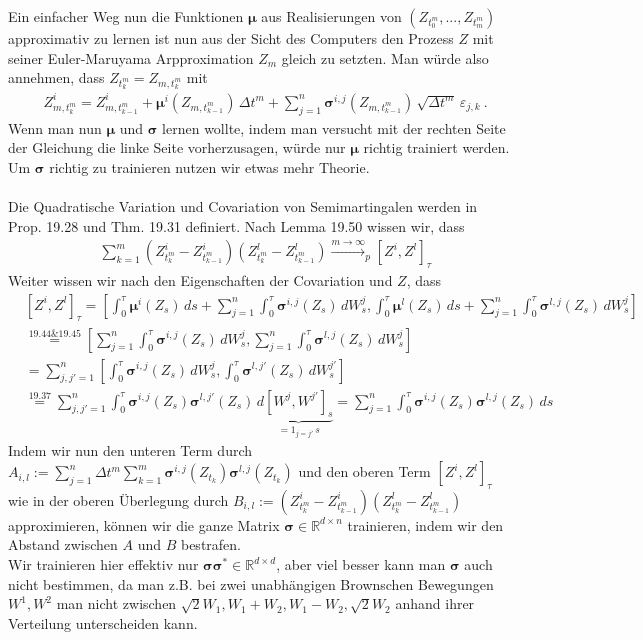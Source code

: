\documentclass[12pt]{article}
\newcommand{\R}{\mathbb{R}}
\newcommand{\bmu}{\bm{\mu}}
\newcommand{\bsig}{\bm{\sigma}}
\begin{document}
	\newpage
	\noindent
	Ein einfacher Weg nun die Funktionen $\bmu$ aus Realisierungen von $(Z_{t^m_0},...,Z_{t^m_m})$ approximativ zu lernen ist nun aus der Sicht des Computers den Prozess $Z$ mit seiner Euler-Maruyama Arpproximation $Z_m$ gleich zu setzten. Man würde also annehmen, dass $Z_{t^m_k} = Z_{m,t^m_k}$ mit
	\begin{align*}
	& Z^i_{m,t^m_k} = Z^i_{m,t^m_{k-1}} + \bmu^i(Z_{m,t^m_{k-1}}) \, \Delta t^m + \sum\limits_{j=1}^n \bsig^{i,j}(Z_{m,t^m_{k-1}}) \, \sqrt{\Delta t^m} \, \varepsilon_{j,k} \ .
	\end{align*}
	Wenn man nun $\bmu$ und $\bsig$ lernen wollte, indem man versucht mit der rechten Seite der Gleichung die linke Seite vorherzusagen, würde nur $\bmu$ richtig trainiert werden. Um $\bsig$ richtig zu trainieren nutzen wir etwas mehr Theorie.\\
	\\
	Die Quadratische Variation und Covariation von Semimartingalen werden in \cite{PfaffiSkript} Prop. 19.28 und Thm. 19.31 definiert. Nach Lemma 19.50 wissen wir, dass
	\begin{align*}
	& \sum\limits_{k=1}^m (Z^i_{t^m_{k}}-Z^i_{t^m_{k-1}})(Z^l_{t^m_{k}}-Z^l_{t^m_{k-1}}) \xrightarrow{m \rightarrow \infty}_p [Z^i,Z^l]_\tau
	\end{align*}
	Weiter wissen wir nach den Eigenschaften der Covariation und $Z$, dass
	\begin{align*}
	& [Z^i,Z^l]_\tau = \left[ \int_0^\tau \bmu^i(Z_s) \, ds + \sum\limits_{j=1}^n \int_0^\tau \bsig^{i,j}(Z_s) \, dW_s^j, \int_0^\tau \bmu^l(Z_s) \, ds + \sum\limits_{j=1}^n \int_0^\tau \bsig^{l,j}(Z_s) \, dW_s^j \right]\\
	& \overset{19.44\&19.45}{=} \left[ \sum\limits_{j=1}^n \int_0^\tau \bsig^{i,j}(Z_s) \, dW_s^j, \sum\limits_{j=1}^n \int_0^\tau \bsig^{l,j}(Z_s) \, dW_s^j \right]\\
	& = \sum\limits_{j,j'=1}^n \left[ \int_0^\tau \bsig^{i,j}(Z_s) \, dW_s^j, \int_0^\tau \bsig^{l,j'}(Z_s) \, dW_s^{j'} \right]\\
	& \overset{19.37}{=} \sum\limits_{j,j'=1}^n \int_0^\tau \bsig^{i,j}(Z_s)\bsig^{l,j'}(Z_s) \, d\underbrace{\left[W^j, W^{j'} \right]_s}_{=1_{j=j'} \, s} = \sum\limits_{j=1}^n \int_0^\tau \bsig^{i,j}(Z_s)\bsig^{l,j}(Z_s) \, ds
	\end{align*}
	Indem wir nun den unteren Term durch $A_{i,l} := \sum\limits_{j=1}^n \Delta t^m \sum\limits_{k=1}^m \bsig^{i,j}(Z_{t_k})\bsig^{l,j}(Z_{t_k})$ und den oberen Term $[Z^i,Z^l]_\tau$ wie in der oberen Überlegung durch $B_{i,l} := (Z^i_{t^m_{k}}-Z^i_{t^m_{k-1}}) (Z^l_{t^m_{k}}-Z^l_{t^m_{k-1}})$ approximieren, können wir die ganze Matrix $\bsig \in \R^{d \times n}$ trainieren, indem wir den Abstand zwischen $A$ und $B$ bestrafen.\\
	Wir trainieren hier effektiv nur $\bsig \bsig^* \in \R^{d \times d}$, aber viel besser kann man $\bsig$ auch nicht bestimmen, da man z.B. bei zwei unabhängigen Brownschen Bewegungen $W^1,W^2$ man nicht zwischen $\sqrt{2}W_1, W_1+W_2, W_1-W_2, \sqrt{2}W_2$ anhand ihrer Verteilung unterscheiden kann.
	
\end{document}
